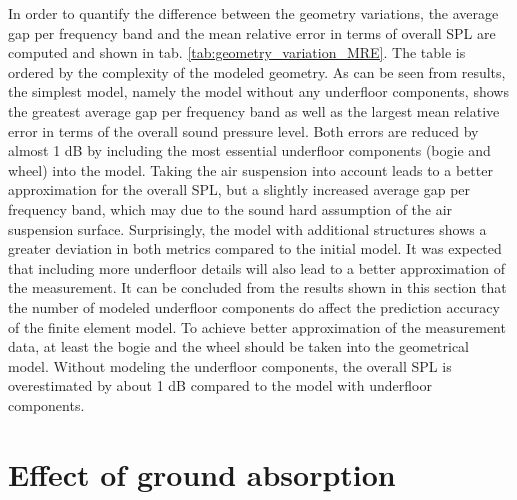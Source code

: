 In order to quantify the difference between the geometry variations, the average gap per frequency band and the mean relative error in terms of overall SPL are computed and shown in tab. \ref{tab:geometry_variation_MRE}. The table is ordered by the complexity of the modeled geometry. As can be seen from results, the simplest model, namely the model without any underfloor components, shows the greatest average gap per frequency band as well as the largest mean relative error in terms of the overall sound pressure level. Both errors are reduced by almost 1 dB by including the most essential underfloor components (bogie and wheel) into the model. Taking the air suspension into account leads to a better approximation for the overall SPL, but a slightly increased average gap per frequency band, which may due to the sound hard assumption of the air suspension surface. Surprisingly, the model with additional structures shows a greater deviation in both metrics  compared to the initial model. It was expected that including more underfloor details will also lead to a better approximation of the measurement. It can be concluded from the results shown in this section that the number of modeled underfloor components do affect the prediction accuracy of the finite element model. To achieve better approximation of the measurement data, at least the bogie and the wheel should be taken into the geometrical model. Without modeling the underfloor components, the overall SPL is overestimated by about 1 dB compared to the model with underfloor components.

\section{Effect of ground absorption}

